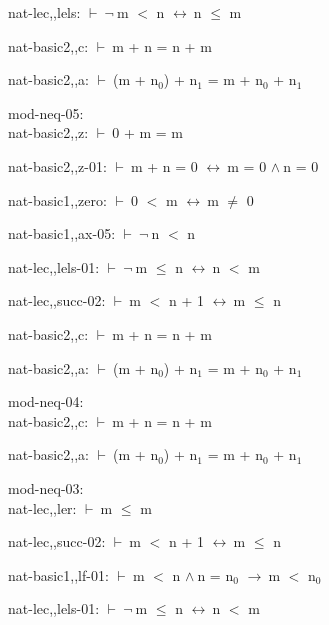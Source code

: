 \documentclass[a4paper]{article}
\newcommand{\Fol}{\mbox{$\vdash\ $}}
\newcommand{\Not}{\mbox{$\neg\ $}}
\newcommand{\And}{\mbox{$\wedge\ $}}
\newcommand{\Imp}{\mbox{$\rightarrow\ $}}
\newcommand{\Equiv}{\mbox{$\leftrightarrow\ $}}
\begin{document}
nat-lec,,lels: 
 \Fol \Not m $<$ n \Equiv n $\le$ m



nat-basic2,,c: 
 \Fol m + n = n + m



nat-basic2,,a: 
 \Fol (m + $\mbox{n}_{0}$) + $\mbox{n}_{1}$ = m + $\mbox{n}_{0}$ + $\mbox{n}_{1}$



\bigskip

mod-neq-05:\\ nat-basic2,,z: 
 \Fol 0 + m = m



nat-basic2,,z-01: 
 \Fol m + n = 0 \Equiv m = 0 \And n = 0



nat-basic1,,zero: 
 \Fol 0 $<$ m \Equiv m $\neq$ 0



nat-basic1,,ax-05: 
 \Fol \Not n $<$ n



nat-lec,,lels-01: 
 \Fol \Not m $\le$ n \Equiv n $<$ m



nat-lec,,succ-02: 
 \Fol m $<$ n + 1 \Equiv m $\le$ n



nat-basic2,,c: 
 \Fol m + n = n + m



nat-basic2,,a: 
 \Fol (m + $\mbox{n}_{0}$) + $\mbox{n}_{1}$ = m + $\mbox{n}_{0}$ + $\mbox{n}_{1}$



\bigskip

mod-neq-04:\\ nat-basic2,,c: 
 \Fol m + n = n + m



nat-basic2,,a: 
 \Fol (m + $\mbox{n}_{0}$) + $\mbox{n}_{1}$ = m + $\mbox{n}_{0}$ + $\mbox{n}_{1}$



\bigskip

mod-neq-03:\\ nat-lec,,ler: 
 \Fol m $\le$ m



nat-lec,,succ-02: 
 \Fol m $<$ n + 1 \Equiv m $\le$ n



nat-basic1,,lf-01: 
 \Fol m $<$ n \And n = $\mbox{n}_{0}$ \Imp m $<$ $\mbox{n}_{0}$



nat-lec,,lels-01: 
 \Fol \Not m $\le$ n \Equiv n $<$ m
\end{document}
